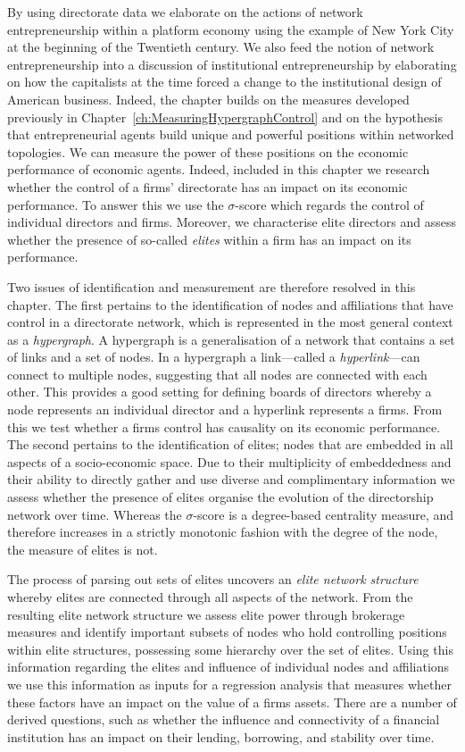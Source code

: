 \medskip\noindent By using directorate data we elaborate on the actions of network entrepreneurship within a platform economy using the example of New York City at the beginning of the Twentieth century. We also feed the notion of network entrepreneurship into a discussion of institutional entrepreneurship by elaborating on how the capitalists at the time forced a change to the institutional design of American business. Indeed, the chapter builds on the measures developed previously in Chapter~\ref{ch:MeasuringHypergraphControl} and on the hypothesis that entrepreneurial agents build unique and powerful positions within networked topologies. We can measure the power of these positions on the economic performance of economic agents. Indeed, included in this chapter we research whether the control of a firms' directorate has an impact on its economic performance. To answer this we use the $\sigma$-score which regards the control of individual directors and firms. Moreover, we characterise elite directors and assess whether the presence of so-called \emph{elites} within a firm has an impact on its performance.

Two issues of identification and measurement are therefore resolved in this chapter. The first pertains to the identification of nodes and affiliations that have control in a directorate network, which is represented in the most general context as a \emph{hypergraph}. A hypergraph is a generalisation of a network that contains a set of links and a set of nodes. In a hypergraph a link---called a \emph{hyperlink}---can connect to multiple nodes, suggesting that all nodes are connected with each other. This provides a good setting for defining boards of directors whereby a node represents an individual director and a hyperlink represents a firms. From this we test whether a firms control has causality on its economic performance. The second pertains to the identification of elites; nodes that are embedded in all aspects of a socio-economic space. Due to their multiplicity of embeddedness and their ability to directly gather and use diverse and complimentary information we assess whether the presence of elites organise the evolution of the directorship network over time. Whereas the $\sigma$-score is a degree-based centrality measure, and therefore increases in a strictly monotonic fashion with the degree of the node, the measure of elites is not.

The process of parsing out sets of elites uncovers an \emph{elite network structure} whereby elites are connected through all aspects of the network. From the resulting elite network structure we assess elite power through brokerage measures and identify important subsets of nodes who hold controlling positions within elite structures, possessing some hierarchy over the set of elites. Using this information regarding the elites and influence of individual nodes and affiliations we use this information as inputs for a regression analysis that measures whether these factors have an impact on the value of a firms assets. There are a number of derived questions, such as whether the influence and connectivity of a financial institution has an impact on their lending, borrowing, and stability over time.

